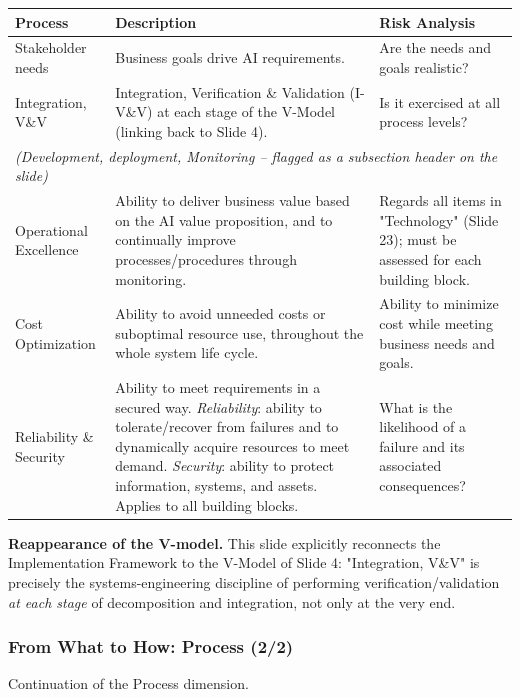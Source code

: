 \begin{center}
\begin{tabular}{p{3cm}p{4.6cm}p{4.6cm}}
\toprule
\textbf{Process} & \textbf{Description} & \textbf{Risk Analysis} \\
\midrule
Stakeholder needs & Business goals drive AI requirements. & Are the needs and goals realistic? \\[0.2cm]
Integration, V\&V & Integration, Verification \& Validation (I-V\&V) at each stage of the V-Model (linking back to Slide 4). & Is it exercised at all process levels? \\[0.2cm]
\multicolumn{3}{l}{\emph{(Development, deployment, Monitoring -- flagged as a subsection header on the slide)}} \\[0.1cm]
Operational Excellence & Ability to deliver business value based on the AI value proposition, and to continually improve processes/procedures through monitoring. & Regards all items in "Technology" (Slide 23); must be assessed for each building block. \\[0.2cm]
Cost Optimization & Ability to avoid unneeded costs or suboptimal resource use, throughout the whole system life cycle. & Ability to minimize cost while meeting business needs and goals. \\[0.2cm]
Reliability \& Security & Ability to meet requirements in a secured way. \emph{Reliability}: ability to tolerate/recover from failures and to dynamically acquire resources to meet demand. \emph{Security}: ability to protect information, systems, and assets. Applies to all building blocks. & What is the likelihood of a failure and its associated consequences? \\
\bottomrule
\end{tabular}
\end{center}


\textbf{Reappearance of the V-model.} This slide explicitly reconnects the Implementation Framework to the V-Model of Slide 4: "Integration, V\&V" is precisely the systems-engineering discipline of performing verification/validation \emph{at each stage} of decomposition and integration, not only at the very end.

\subsubsection{ From What to How: Process (2/2)}

Continuation of the Process dimension.

